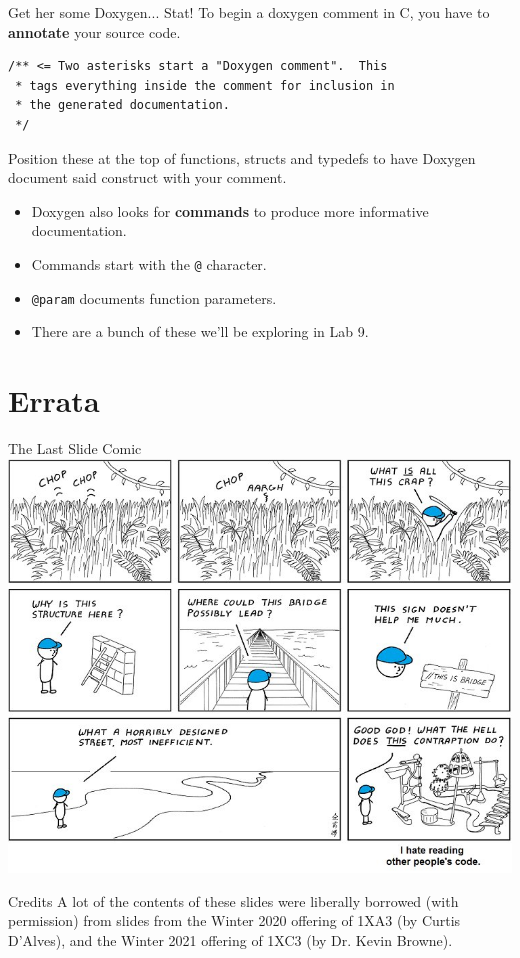 \documentclass[11pt]{beamer}
\begin{document}
\begin{frame}[fragile=singleslide]{Get her some Doxygen... Stat!}
To begin a doxygen comment in C, you have to \textbf{annotate} your source code.
\begin{lstlisting}[style=C]
/** <= Two asterisks start a "Doxygen comment".  This 
 * tags everything inside the comment for inclusion in 
 * the generated documentation.
 */
\end{lstlisting}
Position these at the top of functions, structs and typedefs to have Doxygen document said construct with your comment.  
\begin{itemize}
\item Doxygen also looks for \textbf{commands} to produce more informative documentation.
\item Commands start with the \texttt{@} character. 
\item \texttt{@param} documents function parameters.  
\item There are a bunch of these we'll be exploring in Lab 9.  
\end{itemize}
\end{frame}

\section[Errata]{Errata}

\begin{frame}{The Last Slide Comic}
\center
\includegraphics[scale=0.3]{comments2.jpg}
\end{frame}

\begin{frame}{Credits}
\center
\vspace{8em}
A lot of the contents of these slides were liberally borrowed (with permission) from slides from the Winter 2020 offering of 1XA3 (by Curtis D'Alves), and the Winter 2021 offering of 1XC3 (by Dr. Kevin Browne).
\end{frame}
\end{document}
